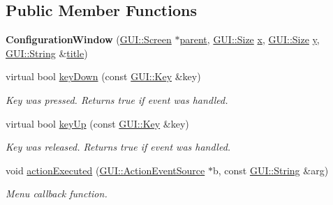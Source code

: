 \subsection*{Public Member Functions}
\begin{DoxyCompactItemize}
\item 
\hypertarget{classConfigurationWindow_a3fe3926878b809d03171a758f56332c5}{{\bfseries Configuration\-Window} (\hyperlink{classGUI_1_1Screen}{G\-U\-I\-::\-Screen} $\ast$\hyperlink{classGUI_1_1Window_a2e593ff65e7702178d82fe9010a0b539}{parent}, \hyperlink{namespaceGUI_a10b6232e08729baa0bd211a86a69ce36}{G\-U\-I\-::\-Size} \hyperlink{classGUI_1_1Window_a6ca6a80ca00c9e1d8ceea8d3d99a657d}{x}, \hyperlink{namespaceGUI_a10b6232e08729baa0bd211a86a69ce36}{G\-U\-I\-::\-Size} \hyperlink{classGUI_1_1Window_a0ee8e923aff2c3661fc2e17656d37adf}{y}, \hyperlink{classGUI_1_1String}{G\-U\-I\-::\-String} \&\hyperlink{classGUI_1_1ToplevelWindow_a04de191f9a57b5b584657866a4ac6843}{title})}\label{classConfigurationWindow_a3fe3926878b809d03171a758f56332c5}

\item 
\hypertarget{classConfigurationWindow_a50012cee347cd3023436746bcc3a7b38}{virtual bool \hyperlink{classConfigurationWindow_a50012cee347cd3023436746bcc3a7b38}{key\-Down} (const \hyperlink{classGUI_1_1Key}{G\-U\-I\-::\-Key} \&key)}\label{classConfigurationWindow_a50012cee347cd3023436746bcc3a7b38}

\begin{DoxyCompactList}\small\item\em Key was pressed. Returns true if event was handled. \end{DoxyCompactList}\item 
\hypertarget{classConfigurationWindow_aa38d03b7c12e26d301baaf5fc17bebc2}{virtual bool \hyperlink{classConfigurationWindow_aa38d03b7c12e26d301baaf5fc17bebc2}{key\-Up} (const \hyperlink{classGUI_1_1Key}{G\-U\-I\-::\-Key} \&key)}\label{classConfigurationWindow_aa38d03b7c12e26d301baaf5fc17bebc2}

\begin{DoxyCompactList}\small\item\em Key was released. Returns true if event was handled. \end{DoxyCompactList}\item 
\hypertarget{classConfigurationWindow_a2dac96be9ab39e51f0eabec372406664}{void \hyperlink{classConfigurationWindow_a2dac96be9ab39e51f0eabec372406664}{action\-Executed} (\hyperlink{classGUI_1_1ActionEventSource}{G\-U\-I\-::\-Action\-Event\-Source} $\ast$b, const \hyperlink{classGUI_1_1String}{G\-U\-I\-::\-String} \&arg)}\label{classConfigurationWindow_a2dac96be9ab39e51f0eabec372406664}

\begin{DoxyCompactList}\small\item\em Menu callback function. \end{DoxyCompactList}\end{DoxyCompactItemize}
